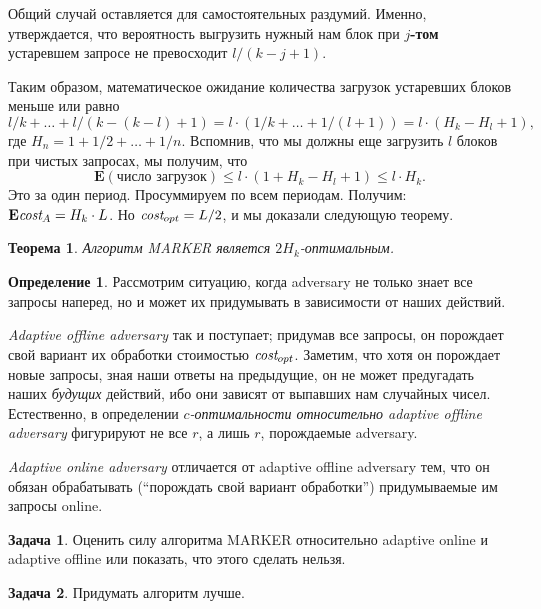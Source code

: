 \documentclass[a4paper]{article}
\theoremstyle{indented}
\newtheorem{theorem}{Теорема}
\theoremstyle{definition}
\newtheorem{defn}{Определение}
\newtheorem{prob}{Задача}
\theoremstyle{remark}
\begin{document}
Общий случай оставляется для самостоятельных раздумий. 
Именно, утверждается, что вероятность выгрузить нужный нам блок при 
{\bfseries $j$-том} устаревшем запросе не превосходит $l/(k-j+1)$.

Таким образом, математическое ожидание количества загрузок устаревших блоков 
меньше или равно 
$$
l/k + \ldots + l/(k-(k-l)+1) = 
l \cdot (1/k+\ldots+1/(l+1)) = 
l \cdot (H_k-H_l+1),
$$ 
где $H_n = 1+1/2+\ldots+1/n$. 
Вспомнив, что мы должны еще загрузить $l$ блоков при чистых запросах, 
мы получим, что 
$$
\mathbf{E}(\textrm{число загрузок}) \le l \cdot (1+H_k-H_l+1) \le l \cdot H_k.
$$
Это за один период. Просуммируем по всем периодам. 
Получим: $\mathbf{E}{\textit{cost}}_A = H_k \cdot L$. 
Но ${\textit{cost}}_{opt} = L/2$, и мы доказали следующую теорему. \\ 

\begin{theorem}
Алгоритм MARKER является $2H_k$-оптимальным.
\end{theorem}

\begin{defn}
Рассмотрим ситуацию, когда adversary не только знает все запросы наперед,
но и может их придумывать в зависимости от наших действий.

\emph{Adaptive offline adversary} так и поступает; придумав все запросы,
он порождает свой вариант их обработки стоимостью ${\textit{cost}}_{opt}$.
Заметим, что хотя он порождает новые запросы, зная наши ответы
на предыдущие, он не может предугадать наших \emph{будущих} действий,
ибо они зависят от выпавших нам случайных чисел. Естественно, в определении
\emph{$c$-оптимальности относительно adaptive offline adversary} фигурируют
не все $r$, а лишь $r$, порождаемые adversary.

\emph{Adaptive online adversary} отличается от adaptive offline adversary тем,
что он обязан обрабатывать (``порождать свой вариант обработки'')
придумываемые им запросы online.
\end{defn}

\begin{prob}
Оценить силу алгоритма MARKER относительно adaptive online и 
adaptive offline или 
показать, что этого сделать нельзя.
\end{prob}

\begin{prob}
Придумать алгоритм лучше.
\end{prob}
\end{document}
